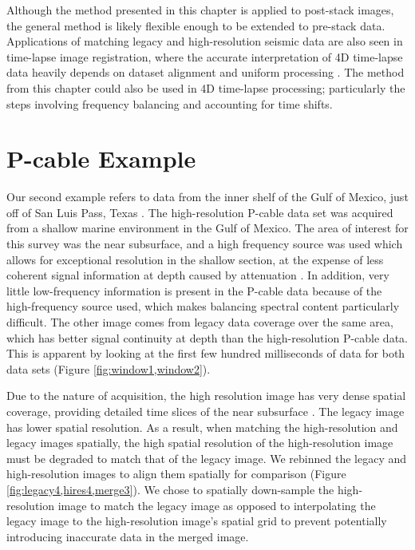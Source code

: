     Although the method presented in this chapter is applied to post-stack images, the general method is likely flexible enough to be extended to pre-stack data.
    Applications of matching legacy and high-resolution seismic data are also seen in time-lapse image registration, where the accurate interpretation of 4D time-lapse data heavily depends on dataset alignment and uniform processing \cite[]{nonuniform}.
    The method from this chapter could also be used in 4D time-lapse processing; particularly the steps involving frequency balancing and accounting for time shifts.
    
\section{P-cable Example}
    Our second example refers to data from the inner shelf of the Gulf of Mexico, just off of San Luis Pass, Texas \cite[]{data}.
    The high-resolution P-cable data set was acquired from a shallow marine environment in the Gulf of Mexico. 
    The area of interest for this survey was the near subsurface, and a high frequency source was used which allows for exceptional resolution in the shallow section, at the expense of less coherent signal information at depth caused by attenuation \cite[]{tip}. 
    In addition, very little low-frequency information is present in the P-cable data because of the high-frequency source used, which makes balancing spectral content particularly difficult. 
    The other image comes from legacy data coverage over the same area, which has better signal continuity at depth than the high-resolution P-cable data. 
    This is apparent by looking at the first few hundred milliseconds of data for both data sets 
    (Figure \ref{fig:window1,window2}).

    
    Due to the nature of acquisition, the high resolution image has very dense spatial coverage, 
    providing detailed time slices of the near subsurface \cite[]{tip}. 
    The legacy image has lower spatial resolution. 
    As a result, when matching the high-resolution and legacy images spatially, the high spatial resolution of the high-resolution image must be degraded to match that of the legacy image. 
    We rebinned the legacy and high-resolution images to align them spatially for comparison (Figure \ref{fig:legacy4,hires4,merge3}).
    We chose to spatially down-sample the high-resolution image to match the legacy image as opposed to interpolating the legacy image to the high-resolution image's spatial grid to prevent potentially introducing inaccurate data in the merged image.
    
